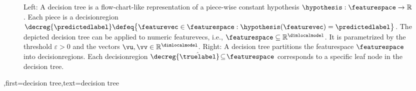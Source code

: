 {{{{\begin{figure}[H]
\begin{minipage}{.45\textwidth}
\end{minipage}
	\caption{Left: A decision tree is a flow-chart-like representation of a piece-wise constant \gls{hypothesis} $\hypothesis: \featurespace \rightarrow \mathbb{R}$.  Each piece is a \gls{decisionregion} $\decreg{\predictedlabel} \defeq \big\{ \featurevec \in  \featurespace: \hypothesis(\featurevec) = \predictedlabel \big\}$. 
		The depicted decision tree can be applied to numeric \gls{featurevec}s, i.e., $\featurespace \subseteq \mathbb{R}^{\dimlocalmodel}$. It is  parametrized by the threshold $\varepsilon>0$ and the vectors $\vu, \vv \in \mathbb{R}^{\dimlocalmodel}$. 
		Right: A decision tree partitions  
		the \gls{featurespace} $\featurespace$ into \gls{decisionregion}s. Each \gls{decisionregion}  
		$\decreg{\hat{\truelabel}} \!\subseteq\!\featurespace$ corresponds to a specific leaf node in the decision tree.}
	\label{fig_decision_tree}
\end{figure} 
	  }
	  ,first={decision tree},text={decision tree} }



}}
